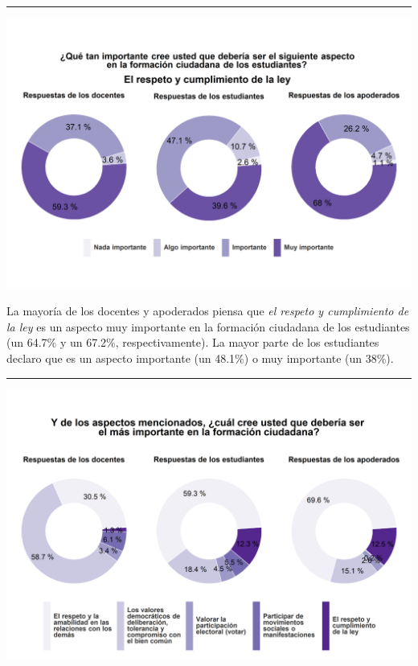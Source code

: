 \documentclass[
  14pt,
]{book}
\let\origfigure\figure
\let\endorigfigure\endfigure
\renewenvironment{figure}[1][2] {
  \expandafter\origfigure\expandafter[H]
} {
  \endorigfigure
}
\begin{document}
\begin{center}\rule{0.5\linewidth}{0.5pt}\end{center}

\begin{figure}[!ht]

{\centering \includegraphics[width=0.8\linewidth,]{images/graph_for_ciud5} 

}

\caption{Relevancia del cumplimiento de la ley}\label{fig:unnamed-chunk-29}
\end{figure}

La mayoría de los docentes y apoderados piensa que \emph{el respeto y cumplimiento de la ley} es un aspecto muy importante en la formación ciudadana de los estudiantes (un 64.7\% y un 67.2\%, respectivamente). La mayor parte de los estudiantes declaro que es un aspecto importante (un 48.1\%) o muy importante (un 38\%).

\begin{center}\rule{0.5\linewidth}{0.5pt}\end{center}

\begin{figure}[!ht]

{\centering \includegraphics[width=0.8\linewidth,]{images/graph_for_ciud6} 

}

\caption{Aspecto más relevante en la formación ciudadana}\label{fig:unnamed-chunk-30}
\end{figure}
\end{document}
